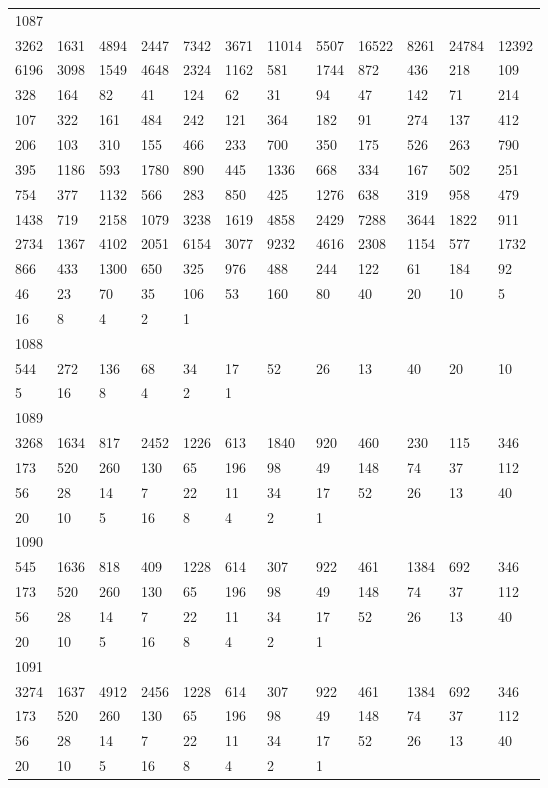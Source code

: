 \begin{longtable}{llllllllllll}
1087&&&&&&&&&&&\\
3262& 1631& 4894& 2447& 7342& 3671& 11014& 5507& 16522& 8261& 24784& 12392\\
6196& 3098& 1549& 4648& 2324& 1162& 581& 1744& 872& 436& 218& 109\\
328& 164& 82& 41& 124& 62& 31& 94& 47& 142& 71& 214\\
107& 322& 161& 484& 242& 121& 364& 182& 91& 274& 137& 412\\
206& 103& 310& 155& 466& 233& 700& 350& 175& 526& 263& 790\\
395& 1186& 593& 1780& 890& 445& 1336& 668& 334& 167& 502& 251\\
754& 377& 1132& 566& 283& 850& 425& 1276& 638& 319& 958& 479\\
1438& 719& 2158& 1079& 3238& 1619& 4858& 2429& 7288& 3644& 1822& 911\\
2734& 1367& 4102& 2051& 6154& 3077& 9232& 4616& 2308& 1154& 577& 1732\\
866& 433& 1300& 650& 325& 976& 488& 244& 122& 61& 184& 92\\
46& 23& 70& 35& 106& 53& 160& 80& 40& 20& 10& 5\\
16& 8& 4& 2& 1& \\

1088&&&&&&&&&&&\\
544& 272& 136& 68& 34& 17& 52& 26& 13& 40& 20& 10\\
5& 16& 8& 4& 2& 1& \\

1089&&&&&&&&&&&\\
3268& 1634& 817& 2452& 1226& 613& 1840& 920& 460& 230& 115& 346\\
173& 520& 260& 130& 65& 196& 98& 49& 148& 74& 37& 112\\
56& 28& 14& 7& 22& 11& 34& 17& 52& 26& 13& 40\\
20& 10& 5& 16& 8& 4& 2& 1& \\

1090&&&&&&&&&&&\\
545& 1636& 818& 409& 1228& 614& 307& 922& 461& 1384& 692& 346\\
173& 520& 260& 130& 65& 196& 98& 49& 148& 74& 37& 112\\
56& 28& 14& 7& 22& 11& 34& 17& 52& 26& 13& 40\\
20& 10& 5& 16& 8& 4& 2& 1& \\

1091&&&&&&&&&&&\\
3274& 1637& 4912& 2456& 1228& 614& 307& 922& 461& 1384& 692& 346\\
173& 520& 260& 130& 65& 196& 98& 49& 148& 74& 37& 112\\
56& 28& 14& 7& 22& 11& 34& 17& 52& 26& 13& 40\\
20& 10& 5& 16& 8& 4& 2& 1& \\


\end{longtable}
